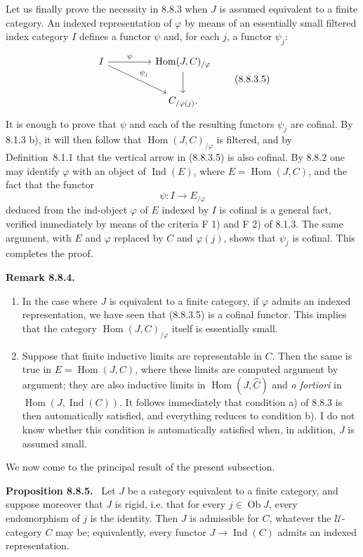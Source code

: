 \documentclass[11pt]{article}
\newcommand{\U}{\mathcal{U}}
\newcommand{\Ob}{\operatorname{Ob}}
\newcommand{\Ind}{\operatorname{Ind}}
\newcommand{\Hhom}{\operatorname{Hom}}
\newenvironment{statement}[1]{\par\medskip\noindent\textbf{#1.}\ }{\par\medskip}
\begin{document}
Let us finally prove the necessity in 8.8.3 when $J$ is assumed equivalent to a finite category. An indexed representation of $\varphi$ by means of an essentially small filtered index category $I$ defines a functor $\psi$ and, for each $j$, a functor $\psi_j$:
\[
\begin{tikzcd}[column sep=4.4em,row sep=2.2em]
 I \arrow[r,"\psi"] \arrow[dr,swap,"\psi_j"'] & \Hhom(J,C)_{/\varphi} \arrow[d] \\
 & C_{/\varphi(j)} .
\end{tikzcd}
\tag{8.8.3.5}
\]
It is enough to prove that $\psi$ and each of the resulting functors $\psi_j$ are cofinal. By 8.1.3 b), it will then follow that $\Hhom(J,C)_{/\varphi}$ is filtered, and by Definition~8.1.1 that the vertical arrow in (8.8.3.5) is also cofinal. By 8.8.2 one may identify $\varphi$ with an object of $\Ind(E)$, where $E=\Hhom(J,C)$, and the fact that the functor
\[
 \psi:I\longrightarrow E_{/\varphi}
\]
deduced from the ind-object $\varphi$ of $E$ indexed by $I$ is cofinal is a general fact, verified immediately by means of the criteria F 1) and F 2) of 8.1.3. The same argument, with $E$ and $\varphi$ replaced by $C$ and $\varphi(j)$, shows that $\psi_j$ is cofinal. This completes the proof.

\begin{statement}{Remark 8.8.4}
\begin{enumerate}[label=\alph*)]
\item In the case where $J$ is equivalent to a finite category, if $\varphi$ admits an indexed representation, we have seen that (8.8.3.5) is a cofinal functor. This implies that the category $\Hhom(J,C)_{/\varphi}$ itself is essentially small.
\item Suppose that finite inductive limits are representable in $C$. Then the same is true in $E=\Hhom(J,C)$, where these limits are computed argument by argument; they are also inductive limits in $\Hhom(J,\widehat C)$ and \emph{a fortiori} in $\Hhom(J,\Ind(C))$. It follows immediately that condition a) of 8.8.3 is then automatically satisfied, and everything reduces to condition b). I do not know whether this condition is automatically satisfied when, in addition, $J$ is assumed small.
\end{enumerate}
\end{statement}

We now come to the principal result of the present subsection.

\begin{statement}{Proposition 8.8.5}
Let $J$ be a category equivalent to a finite category, and suppose moreover that $J$ is rigid, i.e. that for every $j\in\Ob J$, every endomorphism of $j$ is the identity. Then $J$ is admissible for $C$, whatever the $\U$-category $C$ may be; equivalently, every functor $J\to\Ind(C)$ admits an indexed representation.
\end{statement}
\end{document}
